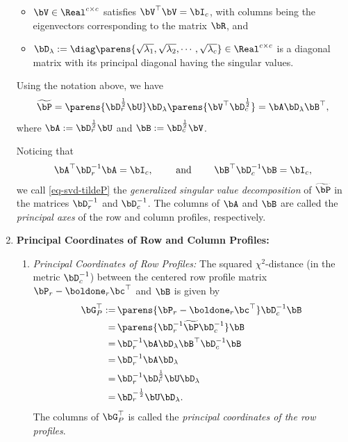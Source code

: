 \documentclass[12pt]{article}
\begin{document}
\begin{enumerate}[label=\textbf{\arabic*.}]
\begin{itemize}
		\item $\bV \in \Real^{c \times c}$ satisfies $\bV^\top \bV = \bI_c$, with columns being the eigenvectors corresponding to the matrix $\bR$, and 
		\item $\bD_{\lambda} := \diag \parens{\sqrt{\lambda_1}, \sqrt{\lambda_2}, \cdots, \sqrt{\lambda_c}} \in \Real^{c \times c}$ is a diagonal matrix with its principal diagonal having the singular values. 
	\end{itemize}
	
	Using the notation above, we have 
	\begin{align}\label{eq-svd-tildeP}
		\widetilde{\bP} = \parens{\bD_r^{\frac{1}{2}} \bU} \bD_{\lambda} \parens{\bV^\top \bD_c^{\frac{1}{2}}} = \bA \bD_{\lambda} \bB^\top, 
	\end{align}
	where $\bA := \bD_r^{\frac{1}{2}} \bU$ and $\bB := \bD_c^{\frac{1}{2}} \bV$. 
	
	Noticing that 
	\begin{align*}
		\bA^\top \bD_r^{-1} \bA = \bI_c, \qquad \text{ and } \qquad \bB^\top \bD_c^{-1} \bB = \bI_c, 
	\end{align*}
	we call \eqref{eq-svd-tildeP} the \emph{generalized singular value decomposition} of $\widetilde{\bP}$ in the matrices $\bD_r^{-1}$ and $\bD_c^{-1}$. The columns of $\bA$ and $\bB$ are called the \emph{principal axes} of the row and column profiles, respectively. 
	
	\item \textbf{Principal Coordinates of Row and Column Profiles:} 
	\begin{enumerate}
		\item \textit{Principal Coordinates of Row Profiles:} The squared $\chi^2$-distance (in the metric $\bD_c^{-1}$) between the centered row profile matrix $\bP_r - \boldone_r \bc^\top$ and $\bB$ is given by 
		\begin{align*}
			\bG_P^\top := & \, \parens{\bP_r - \boldone_r \bc^\top} \bD_c^{-1} \bB \\ 
			= & \, \parens{\bD_r^{-1} \widetilde{\bP} \bD_c^{-1}} \bB \\ 
			= & \, \bD_r^{-1} \bA \bD_{\lambda} \bB^\top \bD_c^{-1} \bB \\
			= & \, \bD_r^{-1} \bA \bD_{\lambda} \\ 
			= & \, \bD_r^{-1} \bD_r^{\frac{1}{2}} \bU \bD_{\lambda} \\ 
			= & \, \bD_r^{-\frac{1}{2}} \bU \bD_{\lambda}. 
		\end{align*}
		The columns of $\bG_P^{\top}$ is called the \emph{principal coordinates of the row profiles}. 
		

\end{enumerate}
\end{enumerate}
\end{document}
